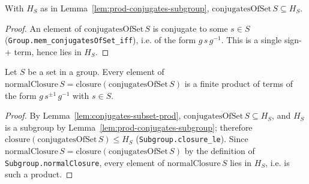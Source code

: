 \begin{lemma}
    \label{lem:conjugates-subset-prod}
    \leanok
    With $H_S$ as in Lemma~\ref{lem:prod-conjugates-subgroup},
    $\mathrm{conjugatesOfSet}\,S \subseteq H_S$.
\end{lemma}
\begin{proof}
    An element of $\mathrm{conjugatesOfSet}\,S$ is conjugate to some $s \in S$
    (\texttt{Group.mem\_conjugatesOfSet\_iff}), i.e. of the form $g\,s\,g^{-1}$.
    This is a single sign-$+$ term, hence lies in $H_S$.
\end{proof}

\begin{lemma}
    \label{lem:closure-prod-conjugates}
    \leanok
    Let $S$ be a set in a group. Every element of
    $\mathrm{normalClosure}\,S = \mathrm{closure}(\mathrm{conjugatesOfSet}\,S)$ is
    a finite product of terms of the form $g\,s^{\pm 1}\,g^{-1}$ with $s \in S$.
\end{lemma}
\begin{proof}
    By Lemma~\ref{lem:conjugates-subset-prod},
    $\mathrm{conjugatesOfSet}\,S \subseteq H_S$, and $H_S$ is a subgroup by
    Lemma~\ref{lem:prod-conjugates-subgroup}; therefore
    $\mathrm{closure}(\mathrm{conjugatesOfSet}\,S) \le H_S$
    (\texttt{Subgroup.closure\_le}). Since
    $\mathrm{normalClosure}\,S = \mathrm{closure}(\mathrm{conjugatesOfSet}\,S)$ by
    the definition of \texttt{Subgroup.normalClosure}, every element of
    $\mathrm{normalClosure}\,S$ lies in $H_S$, i.e. is such a product.
\end{proof}

